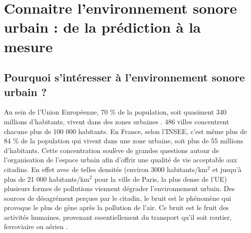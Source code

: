 %
%
%
%
%

\chapter{Connaitre l'environnement sonore urbain : de la prédiction à la mesure}
\thispagestyle{empty}

\section{Pourquoi s'intéresser à l'environnement sonore urbain ?}

Au sein de l'Union Européenne, 70 $\%$ de la population, soit quasiment 340 millions d'habitants, vivent dans des zones urbaines \cite{europ-commission_data_2017}. 486 villes concentrent chacune plus de 100 000 habitants. En France, selon l'INSEE, c'est même plus de 84 $\%$ de la population qui vivent dans une zone urbaine, soit plus de 55 millions d'habitants. Cette concentration soulève de grandes questions autour de l'organisation de l'espace urbain afin d'offrir une qualité de vie acceptable aux citadins. En effet avec de telles densités (environ 3000 habitants/km$^2$ et jusqu'à plus de 21 000  habitants/km$^2$ pour la ville de Paris, la plus dense de l'UE) plusieurs formes de pollutions viennent dégrader l'environnement urbain. Des sources de désagrément perçues par le citadin, le bruit est le phénomène qui provoque le plus de gène après la pollution de l'air. Ce bruit est le fruit des activités humaines, provenant essentiellement du transport qu'il soit routier, ferroviaire ou aérien \cite{zannin_characterization_2013}.\\

